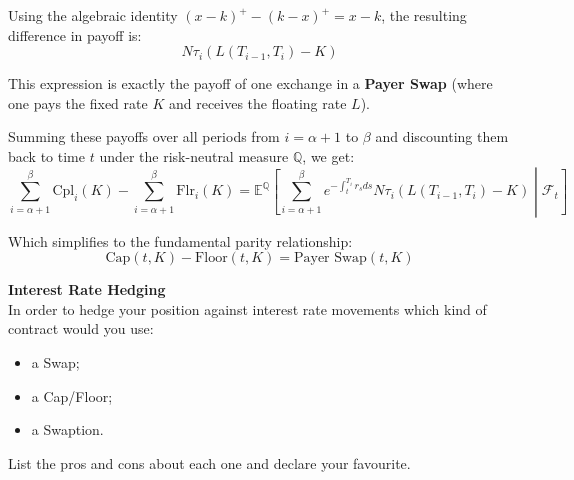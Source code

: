 \documentclass[12pt,a4paper]{exam}
\begin{document}
\begin{questions}
\begin{solution}
Using the algebraic identity $(x - k)^+ - (k - x)^+ = x - k$, the resulting difference in payoff is:
\begin{equation*}
	N \tau_i (L(T_{i-1}, T_i) - K)
\end{equation*}

This expression is exactly the payoff of one exchange in a \textbf{Payer Swap} (where one pays the fixed rate $K$ and receives the floating rate $L$).

Summing these payoffs over all periods from $i = \alpha+1$ to $\beta$ and discounting them back to time $t$ under the risk-neutral measure $\mathbb{Q}$, we get:
\begin{equation*}
	\sum_{i=\alpha+1}^{\beta} \text{Cpl}_i(K) - \sum_{i=\alpha+1}^{\beta} \text{Flr}_i(K) = \mathbb{E}^{\mathbb{Q}} \left[ \sum_{i=\alpha+1}^{\beta} e^{-\int_t^{T_i} r_s ds} N \tau_i (L(T_{i-1}, T_i) - K) \middle| \mathcal{F}_t \right]
\end{equation*}

Which simplifies to the fundamental parity relationship:
\begin{equation*}
	\text{Cap}(t, K) - \text{Floor}(t, K) = \text{Payer Swap}(t, K)
\end{equation*}
\end{solution}

\question \textbf{Interest Rate Hedging} \\
In order to hedge your position against interest rate movements which kind of contract would you use:
\begin{itemize}
	\item a Swap;
	\item a Cap/Floor;
	\item a Swaption.
\end{itemize}
List the pros and cons about each one and declare your favourite.


\end{questions}
\end{document}
